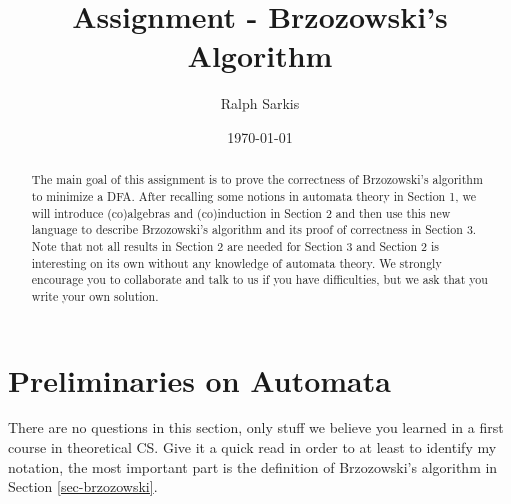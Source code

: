 \documentclass{article}
\title{Assignment - Brzozowski's Algorithm\vspace{-10pt}}
\author{Ralph Sarkis}
\date{\vspace{-10pt}\today \vspace{-15pt}}  %
\theoremstyle{definition}
\theoremstyle{remark}
\begin{document}
\maketitle
\begin{abstract} The main goal of this assignment is to prove the correctness of Brzozowski's algorithm to minimize a DFA. After recalling some notions in automata theory in Section 1, we will introduce (co)algebras and (co)induction in Section 2 and then use this new language to describe Brzozowski's algorithm and its proof of correctness in Section 3. Note that not all results in Section 2 are needed for Section 3 and Section 2 is interesting on its own without any knowledge of automata theory. We strongly encourage you to collaborate and talk to us if you have difficulties, but we ask that you write your own solution.
\end{abstract}

\section{Preliminaries on Automata}
There are no questions in this section, only stuff we believe you learned in a first course in theoretical CS. Give it a quick read in order to at least to identify my notation, the most important part is the definition of Brzozowski's algorithm in Section \ref{sec-brzozowski}.
\end{document}

